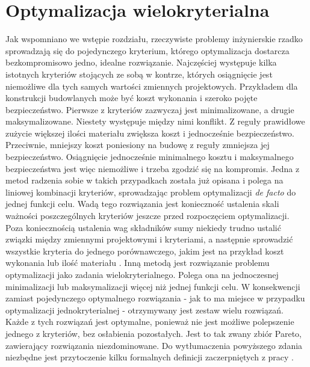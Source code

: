 \section{Optymalizacja wielokryterialna} \label{sect: multiobjective_opt}
Jak wspomniano we wstępie rozdziału, rzeczywiste problemy inżynierskie rzadko sprowadzają się do pojedynczego kryterium, którego optymalizacja dostarcza bezkompromisowo jedno, idealne rozwiązanie. Najczęściej występuje kilka istotnych kryteriów stojących ze sobą w kontrze, których osiągnięcie jest niemożliwe dla tych samych wartości zmiennych projektowych. Przykładem dla konstrukcji budowlanych może być koszt wykonania i szeroko pojęte bezpieczeństwo. Pierwsze z kryteriów zazwyczaj jest minimalizowane, a drugie maksymalizowane. Niestety występuje między nimi konflikt. Z reguły prawidłowe zużycie większej ilości materiału zwiększa koszt i jednocześnie bezpieczeństwo. Przeciwnie, mniejszy koszt poniesiony na budowę z reguły zmniejsza jej bezpieczeństwo. Osiągnięcie jednocześnie minimalnego kosztu i maksymalnego bezpieczeństwa jest więc niemożliwe i trzeba zgodzić się na kompromis. Jedna z metod radzenia sobie w takich przypadkach została już opisana i polega na liniowej kombinacji kryteriów, sprowadzając problem optymalizacji \textit{de facto} do jednej funkcji celu. Wadą tego rozwiązania jest konieczność ustalenia skali ważności poszczególnych kryteriów jeszcze przed rozpoczęciem optymalizacji. Poza koniecznością ustalenia wag składników sumy niekiedy trudno ustalić związki między zmiennymi projektowymi i kryteriami, a następnie sprowadzić wszystkie kryteria do jednego porównawczego, jakim jest na przykład koszt wykonania lub ilość materiału \parencite{Szymczak1995}. Inną metodą jest rozwiązanie problemu optymalizacji jako zadania wielokryterialnego. Polega ona na jednoczesnej minimalizacji lub maksymalizacji więcej niż jednej funkcji celu. W konsekwencji zamiast pojedynczego optymalnego rozwiązania - jak to ma miejsce w przypadku optymalizacji jednokryterialnej - otrzymywany jest zestaw wielu rozwiązań. Każde z tych rozwiązań jest optymalne, ponieważ nie jest możliwe polepszenie jednego z kryteriów, bez osłabienia pozostałych. Jest to tak zwany zbiór Pareto, zawierający rozwiązania niezdominowane. Do wytłumaczenia powyższego zdania niezbędne jest przytoczenie kilku formalnych definicji zaczerpniętych z pracy \parencite{CoelloCoello2006}. 

